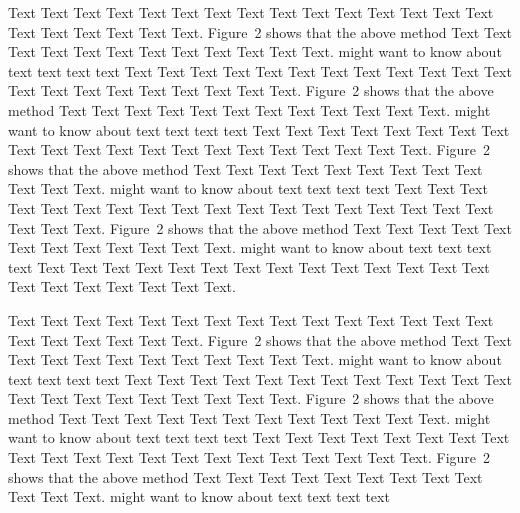 \documentclass{bioinfo}
\begin{document}
\begin{methods}
        Text Text Text Text Text Text Text Text Text Text Text Text Text
        Text Text Text Text Text Text Text Text\vadjust{\newpage}.
        Figure~2\vphantom{\ref{fig:02}} shows that the above method Text
        Text Text Text Text Text Text Text Text Text Text Text.
        \citealp{Boffelli03} might want to know about text text text text
        Text Text Text Text Text Text Text Text Text Text Text Text Text
        Text Text Text Text Text Text Text Text.
        Figure~2\vphantom{\ref{fig:02}} shows that the above method Text
        Text Text Text Text Text Text Text Text Text Text Text.
        \citealp{Boffelli03} might want to know about text text text text
        Text Text Text Text Text Text Text Text Text Text Text Text Text
        Text Text Text Text Text Text Text Text.
        Figure~2\vphantom{\ref{fig:02}} shows that the above method Text
        Text Text Text Text Text Text Text Text Text Text Text.
        \citealp{Boffelli03} might want to know about text text text text
        Text Text Text Text Text Text Text Text Text Text Text Text Text
        Text Text Text Text Text Text Text Text.
        Figure~2\vphantom{\ref{fig:02}} shows that the above method Text
        Text Text Text Text Text Text Text Text Text Text Text.
        \citealp{Boffelli03} might want to know about text text text text
        Text Text Text Text Text Text Text Text Text Text Text Text Text
        Text Text Text Text Text Text Text Text.


        Text Text Text Text Text Text Text Text Text Text Text Text Text
        Text Text Text Text Text Text Text Text.
        Figure~2\vphantom{\ref{fig:02}} shows that the above method Text
        Text Text Text Text Text Text Text Text Text Text Text.
        \citealp{Boffelli03} might want to know about text text text text
        Text Text Text Text Text Text Text Text Text Text Text Text Text
        Text Text Text Text Text Text Text Text.
        Figure~2\vphantom{\ref{fig:02}} shows that the above method Text
        Text Text Text Text Text Text Text Text Text Text Text.
        \citealp{Boffelli03} might want to know about text text text text
        Text Text Text Text Text Text Text Text Text Text Text Text Text
        Text Text Text Text Text Text Text Text.
        Figure~2\vphantom{\ref{fig:02}} shows that the above method Text
        Text Text Text Text Text Text Text Text Text Text Text.
        \citealp{Boffelli03} might want to know about text text text text



\end{methods}
\end{document}
